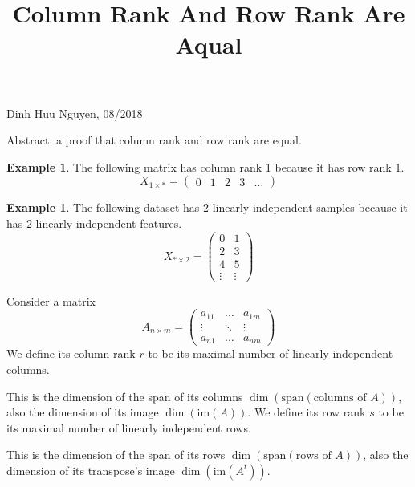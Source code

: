 \documentclass[11pt]{amsart}
\title{Column Rank And Row Rank Are Aqual}
\theoremstyle{definition}
\newtheorem{example}[theorem]{Example}
\begin{document}
\maketitle

\begin{center}
Dinh Huu Nguyen, 08/2018
\end{center}
\vspace{20pt}

Abstract: a proof that column rank and row rank are equal.
\vspace{20pt}

\begin{example} The following matrix has column rank 1 because it has row rank 1.
$$X_{1 \times \ast} = \left( \begin{array}{ccccc} 0 & 1 & 2 & 3 & \dots \end{array} \right)$$
\end{example} 
\vspace{20pt}

\begin{example} The following dataset has 2 linearly independent samples because it has 2 linearly independent features.
$$X_{\ast \times 2} = \left( \begin{array}{cc} 0 & 1 \\ 2 & 3 \\ 4 & 5 \\ \vdots & \vdots \end{array} \right)$$
\end{example}

Consider a matrix
$$A_{n \times m} = \left( \begin{array}{ccc} a_{11} & \dots & a_{1m} \\ \vdots & \ddots & \vdots \\ a_{n1} & \dots & a_{nm} \end{array} \right)$$
\dfn We define its column rank $r$ to be its maximal number of linearly independent columns.

This is the dimension of the span of its columns $\dim(\text{span}(\text{columns of } A))$, also the dimension of its image $\dim(\text{im}(A))$.
\dfn We define its row rank $s$ to be its maximal number of linearly independent rows.

This is the dimension of the span of its rows $\dim(\text{span}(\text{rows of } A))$, also the dimension of its transpose's image $\dim(\text{im}(A^t))$.
\end{document}
